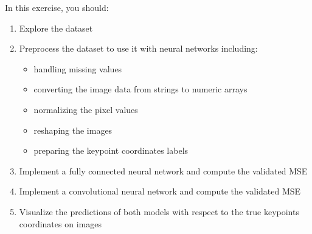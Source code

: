 \documentclass[letterpaper,10pt,english]{jupyterBook}
\begin{document}
\sphinxAtStartPar
In this exercise, you should:
\begin{enumerate}
%
\item {} 
\sphinxAtStartPar
Explore the dataset

\item {} 
\sphinxAtStartPar
Preprocess the dataset to use it with neural networks including:
\begin{itemize}
\item {} 
\sphinxAtStartPar
handling missing values

\item {} 
\sphinxAtStartPar
converting the image data from strings to numeric arrays

\item {} 
\sphinxAtStartPar
normalizing the pixel values

\item {} 
\sphinxAtStartPar
reshaping the images

\item {} 
\sphinxAtStartPar
preparing the keypoint coordinates labels

\end{itemize}

\item {} 
\sphinxAtStartPar
Implement a fully connected neural network and compute the validated MSE

\item {} 
\sphinxAtStartPar
Implement a convolutional neural network and compute the validated MSE

\item {} 
\sphinxAtStartPar
Visualize the predictions of both models with respect to the true keypoints coordinates on images

\end{enumerate}
\end{document}
